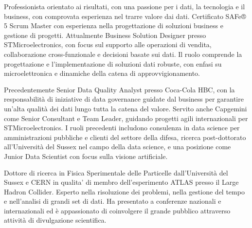 
Professionista orientato ai risultati, con una passione per i dati, la tecnologia e il business, con comprovata esperienza nel trarre valore dai dati. Certificato SAFe® 5 Scrum Master con esperienza nella progettazione di soluzioni business e gestione di progetti. Attualmente Business Solution Designer presso STMicroelectronics, con focus sul supporto alle operazioni di vendita, collaborazione cross-funzionale e decisioni basate sui dati. Il ruolo comprende la progettazione e l'implementazione di soluzioni dati robuste, con enfasi su microelettronica e dinamiche della catena di approvvigionamento.

Precedentemente Senior Data Quality Analyst presso Coca-Cola HBC, con la responsabilità di iniziative di data governance guidate dal business per garantire un'alta qualità dei dati lungo tutta la catena del valore. Servito anche Capgemini come Senior Consultant e Team Leader, guidando progetti agili internazionali per STMicroelectronics. I ruoli precedenti includono consulenza in data science per amministrazioni pubbliche e clienti del settore della difesa, ricerca post-dottorato all'Università del Sussex nel campo della data science, e una posizione come Junior Data Scientist con focus sulla visione artificiale.

Dottore di ricerca in Fisica Sperimentale delle Particelle dall'Università del Sussex e CERN in qualita' di membro dell'esperimento ATLAS presso il Large Hadron Collider. Esperto nella risoluzione dei problemi, nella gestione del tempo e nell'analisi di grandi set di dati. Ha presentato a conferenze nazionali e internazionali ed è appassionato di coinvolgere il grande pubblico attraverso attività di divulgazione scientifica.